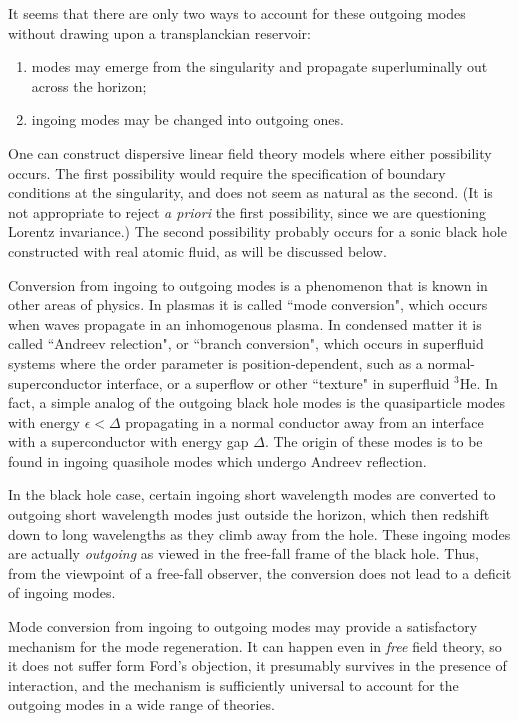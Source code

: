 \documentclass[12pt]{article}
\begin{document}
It seems that there are only two ways to account for these outgoing
modes without drawing upon a transplanckian reservoir:
\begin{enumerate} 
\item modes may emerge from the singularity and
propagate superluminally out across the horizon; 
\item ingoing modes
may be changed into outgoing ones.  
\end{enumerate} 
One can construct
dispersive linear field theory
models\cite{Unruh2,BMPS,Jaco-mex,CorlJaco} where either possibility
occurs. The first possibility would require the specification of
boundary conditions at the singularity, and does not seem as natural
as the second.  (It is not appropriate to reject  {\it a priori} the
first possibility, since we are questioning Lorentz invariance.) The
second possibility probably occurs for a sonic black hole\cite{Unruh1}
constructed with real atomic fluid, as will be discussed below.

Conversion from ingoing to outgoing modes is a phenomenon that is known
in other areas of physics. In plasmas it is called ``mode conversion",
which occurs when waves propagate in an inhomogenous
plasma\cite{Stix,Swanson}. In condensed matter it is called ``Andreev
relection", or ``branch conversion", which occurs in superfluid systems
where the order parameter is position-dependent, such as a
normal-superconductor interface\cite{Andr}, or a superflow or other
``texture" in superfluid $^3$He\cite{GreaLegg}.  In fact, a simple
analog of the outgoing black hole modes is the quasiparticle modes with
energy $\epsilon<\Delta$ propagating in a normal conductor away from an
interface with a superconductor with energy gap $\Delta$. The origin of
these modes is to be found in ingoing quasihole modes which undergo
Andreev reflection.

In the black hole case, certain ingoing short wavelength modes are
converted to outgoing short wavelength modes just outside the horizon,
which then redshift down to long wavelengths as they climb away from
the hole.  These ingoing modes are actually {\it outgoing} as viewed in
the free-fall frame of the black hole. Thus, from the viewpoint of a
free-fall observer, the conversion does not lead to a deficit of
ingoing modes.

Mode conversion from ingoing to outgoing modes may provide a
satisfactory mechanism for the mode regeneration. It can happen even in
{\it free} field theory, so it does not suffer form Ford's objection,
it presumably survives in the presence of interaction, and the
mechanism is sufficiently universal to account for the outgoing modes
in a wide range of theories.
\end{document}
